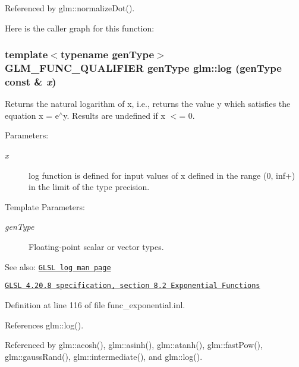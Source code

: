 Referenced by glm::normalizeDot().

Here is the caller graph for this function:\hypertarget{group__core__func__exponential_gce8148db3949f9260f6f883f8dbae808}{
\subsubsection[log]{\setlength{\rightskip}{0pt plus 5cm}template$<$typename genType$>$ GLM\_\-FUNC\_\-QUALIFIER genType glm::log (genType const \& {\em x})}}
\label{group__core__func__exponential_gce8148db3949f9260f6f883f8dbae808}


Returns the natural logarithm of x, i.e., returns the value y which satisfies the equation x = e$^\wedge$y. Results are undefined if x $<$= 0.

\begin{Desc}
\item[Parameters:]
\begin{description}
\item[{\em x}]log function is defined for input values of x defined in the range (0, inf+) in the limit of the type precision. \end{description}
\end{Desc}
\begin{Desc}
\item[Template Parameters:]
\begin{description}
\item[{\em genType}]Floating-point scalar or vector types.\end{description}
\end{Desc}
\begin{Desc}
\item[See also:]\href{http://www.opengl.org/sdk/docs/manglsl/xhtml/log.xml}{\tt GLSL log man page} 

\href{http://www.opengl.org/registry/doc/GLSLangSpec.4.20.8.pdf}{\tt GLSL 4.20.8 specification, section 8.2 Exponential Functions} \end{Desc}


Definition at line 116 of file func\_\-exponential.inl.

References glm::log().

Referenced by glm::acosh(), glm::asinh(), glm::atanh(), glm::fastPow(), glm::gaussRand(), glm::intermediate(), and glm::log().

